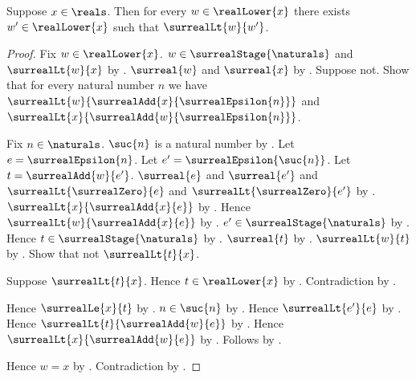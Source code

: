 \begin{theorem}\label{surreal_real_lower_no_maximum}
    Suppose $x\in\reals$.
    Then for every $w\in\realLower{x}$ there exists
        $w'\in\realLower{x}$ such that $\surrealLt{w}{w'}$.
\end{theorem}
\begin{proof}
    Fix $w\in\realLower{x}$.
    $w\in\surrealStage{\naturals}$ and $\surrealLt{w}{x}$
        by .
    $\surreal{w}$ and $\surreal{x}$
        by
        .
    Suppose not.
    Show that for every natural number $n$ we have
        $\surrealLt{w}{\surrealAdd{x}{\surrealEpsilon{n}}}$ and
        $\surrealLt{x}{\surrealAdd{w}{\surrealEpsilon{n}}}$.
    \begin{subproof}
        Fix $n\in\naturals$.
        $\suc{n}$ is a natural number
            by .
        Let $e=\surrealEpsilon{n}$.
        Let $e'=\surrealEpsilon{\suc{n}}$.
        Let $t=\surrealAdd{w}{e'}$.
        $\surreal{e}$ and $\surreal{e'}$ and
            $\surrealLt{\surrealZero}{e}$ and
            $\surrealLt{\surrealZero}{e'}$
            by
            .
        $\surrealLt{x}{\surrealAdd{x}{e}}$
            by
            .
        Hence $\surrealLt{w}{\surrealAdd{x}{e}}$
            by
            .
        $e'\in\surrealStage{\naturals}$
            by .
        Hence $t\in\surrealStage{\naturals}$
            by .
        $\surreal{t}$
            by
            .
        $\surrealLt{w}{t}$
            by
            .
        Show that not $\surrealLt{t}{x}$.
        \begin{subproof}
            Suppose $\surrealLt{t}{x}$.
            Hence $t\in\realLower{x}$
                by .
            Contradiction by \auto.
        \end{subproof}
        Hence $\surrealLe{x}{t}$
            by .
        $n\in\suc{n}$ by .
        Hence $\surrealLt{e'}{e}$
            by .
        Hence $\surrealLt{t}{\surrealAdd{w}{e}}$
            by .
        Hence $\surrealLt{x}{\surrealAdd{w}{e}}$
            by
            .
        Follows by \auto.
    \end{subproof}
    Hence $w=x$ by .
    Contradiction by .
\end{proof}

